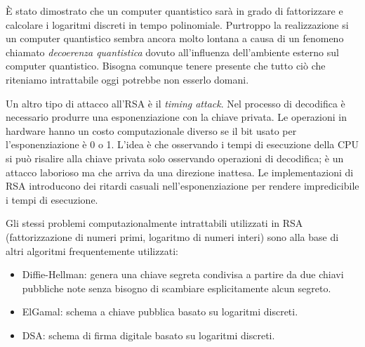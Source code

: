 È stato dimostrato che un computer quantistico sarà in grado di fattorizzare e calcolare i logaritmi discreti in tempo polinomiale. Purtroppo la realizzazione si un computer quantistico sembra ancora molto lontana a causa di un fenomeno chiamato \textit{decoerenza quantistica} dovuto all'influenza dell'ambiente esterno sul computer quantistico. Bisogna comunque tenere presente che tutto ciò che riteniamo intrattabile oggi potrebbe non esserlo domani.

Un altro tipo di attacco all'RSA è il \textit{timing attack}. Nel processo di decodifica è necessario produrre una esponenziazione con la chiave privata. Le operazioni in hardware hanno un costo computazionale diverso se il bit usato per l'esponenziazione è 0 o 1. L'idea è che osservando i tempi di esecuzione della CPU si può risalire alla chiave privata solo osservando operazioni di decodifica; è un attacco laborioso ma che arriva da una direzione inattesa. Le implementazioni di RSA introducono dei ritardi casuali nell'esponenziazione per rendere impredicibile i tempi di esecuzione.

Gli stessi problemi computazionalmente intrattabili utilizzati in RSA (fattorizzazione di numeri primi, logaritmo di numeri interi) sono alla base di altri algoritmi frequentemente utilizzati:
\begin{itemize}
	\item Diffie-Hellman: genera una chiave segreta condivisa a partire da due chiavi pubbliche note senza bisogno di scambiare esplicitamente alcun segreto.
	\item ElGamal: schema a chiave pubblica basato su logaritmi discreti.
	\item DSA: schema di firma digitale basato su logaritmi discreti.
\end{itemize}

